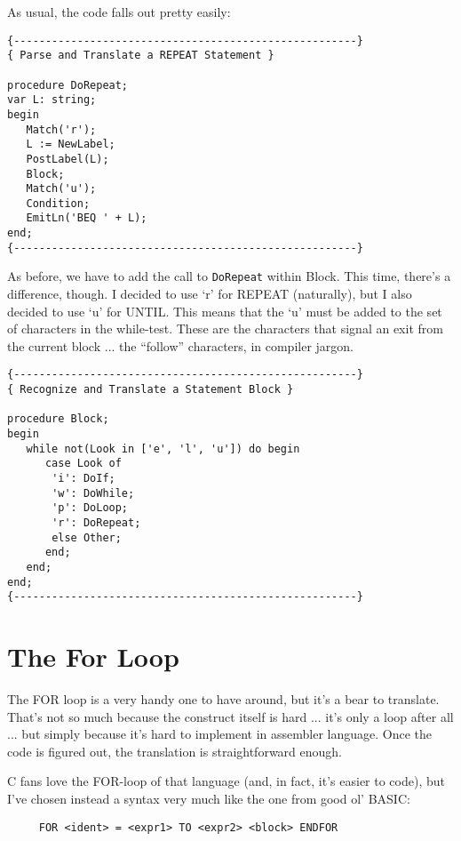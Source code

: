 As usual, the code falls out pretty easily:

\begin{verbatim}
{------------------------------------------------------}
{ Parse and Translate a REPEAT Statement }

procedure DoRepeat;
var L: string;
begin
   Match('r');
   L := NewLabel;
   PostLabel(L);
   Block;
   Match('u');
   Condition;
   EmitLn('BEQ ' + L);
end;
{------------------------------------------------------}
\end{verbatim}

As  before, we have to add the call  to  {\tt DoRepeat}  within  Block. This time, there's a difference, though. I decided  to  use  `r' for REPEAT (naturally), but I also decided to use `u'  for UNTIL. This means that the `u' must be added to the set of characters in the while-test. These  are  the  characters  that signal an exit from the current  block  ... the ``follow'' characters, in compiler jargon.

\begin{verbatim}
{------------------------------------------------------}
{ Recognize and Translate a Statement Block }

procedure Block;
begin
   while not(Look in ['e', 'l', 'u']) do begin
      case Look of
       'i': DoIf;
       'w': DoWhile;
       'p': DoLoop;
       'r': DoRepeat;
       else Other;
      end;
   end;
end;
{------------------------------------------------------}
\end{verbatim}

\section{The For Loop}

The FOR loop  is a very handy one to have around, but it's a bear to translate. That's not so much because the construct itself is hard ... it's only a loop  after  all ... but simply because it's hard to implement  in  assembler  language. Once  the  code is figured out, the translation is straightforward enough.

C fans love  the  FOR-loop  of  that language (and, in fact, it's easier to code), but I've chosen instead a syntax very  much like the one from good ol' BASIC:

\begin{verbatim}
     FOR <ident> = <expr1> TO <expr2> <block> ENDFOR
\end{verbatim}

